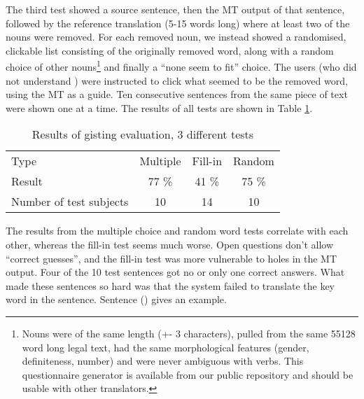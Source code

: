 \documentclass{book}
\begin{document}
The third test showed a \sme{} source sentence, then the MT output of
that sentence, followed by the reference translation (5-15 words long)
where at least two of the nouns were removed. For each removed noun,
we instead showed a randomised, clickable list consisting of the
originally removed word, along with a random choice of other
nouns\footnote{Nouns were of the same length (+- 3 characters), pulled
  from the same 55128 word long legal text, had the same morphological
  features (gender, definiteness, number) and were never ambiguous
  with verbs. This questionnaire generator is available from our
  public repository and should be usable with other translators.} and
finally a ``none seem to fit'' choice. The users (who did not understand
\sme{}) were instructed to click what seemed to be the removed word,
using the MT as a guide. Ten consecutive sentences from the same piece
of text were shown one at a time. The results of all tests are shown
in Table \ref{eval}.

\begin{table}[htdp]
\caption{Results of gisting evaluation, 3 different tests}
\begin{center}
\begin{tabular}{lccc}
Type & Multiple & Fill-in & Random \\
Result & 77 \% & 41 \% & 75 \% \\
Number of test subjects & 10 & 14  & 10  \\
\end{tabular}
\end{center}
\label{eval}
\end{table}%



The results from the multiple choice and random word tests correlate
with each other, whereas the fill-in test seems much worse. Open
questions don't allow ``correct guesses'', and the fill-in test was
more vulnerable to holes in the MT output. Four of the 10 test
sentences got no or only one correct answers. What made these
sentences so hard was that the system failed to translate the key word
in the sentence. Sentence () gives an example.

\end{document}
